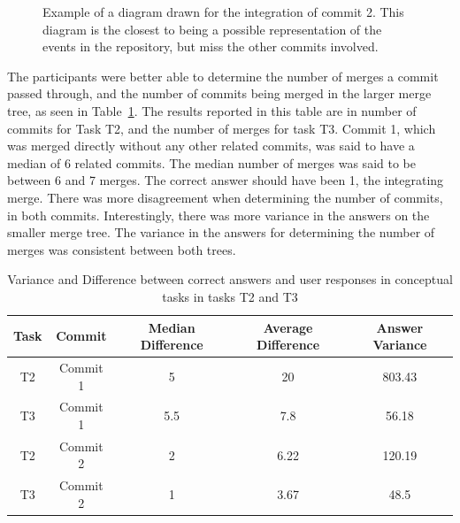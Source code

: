 \begin{figure}[htpb]
  \centering
  \caption{Example of a diagram drawn for the integration of commit 2.
    This diagram is the closest to being a possible representation of
    the events in the repository, but miss the other commits involved.}
  \label{fig:commit_2_fig}
\end{figure}

The participants were better able to determine the number of merges a
commit passed through, and the number of commits being merged in the
larger merge tree, as seen in Table~\ref{tab:conceptual_results}. The
results reported in this table are in number of commits for Task T2, and
the number of merges for task T3. Commit 1, which was merged directly
without any other related commits, was said to have a median of 6
related commits. The median number of merges was said to be between 6
and 7 merges. The correct answer should have been 1, the integrating
merge. There was more disagreement when determining the number of
commits, in both commits. Interestingly, there was more variance in the
answers on the smaller merge tree. The variance in the answers for
determining the number of merges was consistent between both trees.

\begin{table}[htpb]
  \centering
  \caption{Variance and Difference between correct answers and user
    responses in conceptual tasks in tasks T2 and T3}
  \label{tab:conceptual_results}
  \begin{tabular}{ccccc}
    \toprule
    Task & Commit   & Median Difference & Average Difference & Answer Variance\\\midrule
    T2   & Commit 1 & 5                 & 20                 & 803.43\\
    T3   & Commit 1 & 5.5               & 7.8                & 56.18\\
    T2   & Commit 2 & 2                 & 6.22               & 120.19\\
    T3   & Commit 2 & 1                 & 3.67               & 48.5\\
    \bottomrule
  \end{tabular}
\end{table}

